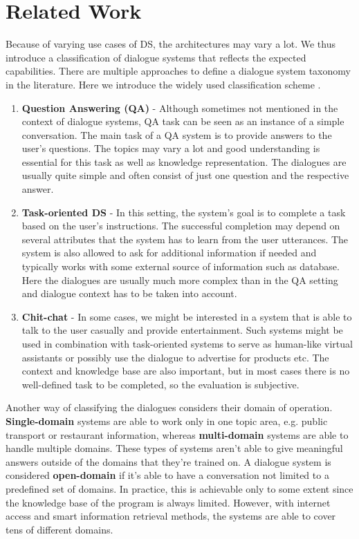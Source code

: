 \chapter{Related Work}%
\label{chap:related}

\label{sec:relwork}
Because of varying use cases of DS, the architectures may vary a lot.
We thus introduce a classification of dialogue systems that reflects the expected capabilities.
There are multiple approaches to define a dialogue system taxonomy in the literature.
Here we introduce the widely used classification scheme \cite{jurafsky2000speech}.
\begin{enumerate}
    \item \textbf{Question Answering (QA)} - Although sometimes not mentioned in the context of dialogue systems, QA task can be seen as an instance of a simple conversation. The main task of a QA system is to provide answers to the user's questions.
    The topics may vary a lot and good understanding is essential for this task as well as knowledge representation.
    The dialogues are usually quite simple and often consist of just one question and the respective answer.
    \item \textbf{Task-oriented DS} - In this setting, the system's goal is to complete a task based on the user's instructions.
    The successful completion may depend on several attributes that the system has to learn from the user utterances.
    The system is also allowed to ask for additional information if needed and typically works with some external source of information such as database.
    Here the dialogues are usually much more complex than in the QA setting and dialogue context has to be taken into account.
    \item \textbf{Chit-chat} - In some cases, we might be interested in a system that is able to talk to the user casually and provide entertainment.
    Such systems might be used in combination with task-oriented systems to serve as human-like virtual assistants or possibly use the dialogue to advertise for products etc.
    The context and knowledge base are also important, but in most cases there is no well-defined task to be completed, so the evaluation is subjective.
\end{enumerate}

Another way of classifying the dialogues considers their domain of operation.
\textbf{Single-domain} systems are able to work only in one topic area, e.g. public transport or restaurant information, whereas \textbf{multi-domain} systems are able to handle multiple domains.
These types of systems aren't able to give meaningful answers outside of the domains that they're trained on.
A dialogue system is considered \textbf{open-domain} if it's able to have a conversation not limited to a predefined set of domains.
In practice, this is achievable only to some extent since the knowledge base of the program is always limited.
However, with internet access and smart information retrieval methods, the systems are able to cover tens of different domains.

